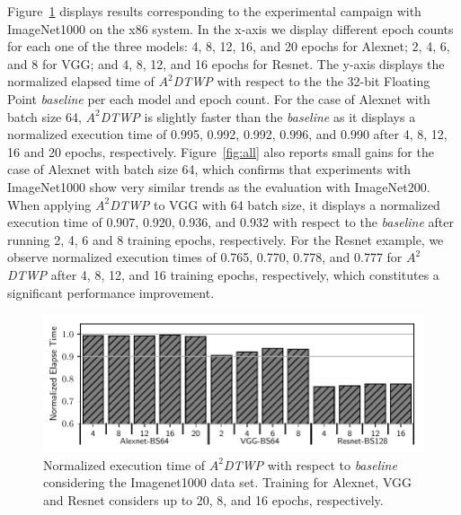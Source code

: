Figure~\ref{fig:ImageNet1000} displays results corresponding to the experimental campaign with ImageNet1000 on the x86 system.
In the x-axis we display different epoch counts for each one of the three models: 4, 8, 12, 16, and 20 epochs for Alexnet; 2, 4, 6, and 8 for VGG; and 4, 8, 12, and 16 epochs for Resnet.
The y-axis displays the normalized elapsed time of \textit{$A^2$DTWP} with respect to the the 32-bit Floating Point \textit{baseline} per each model and epoch count.
For the case of Alexnet with batch size 64, \textit{$A^2$DTWP} is slightly faster than the \textit{baseline} as it displays a normalized execution time of 0.995, 0.992, 0.992, 0.996, and 0.990 after 4, 8, 12, 16 and 20 epochs, respectively.
Figure~\ref{fig:all} also reports small gains for the case of Alexnet with batch size 64, which confirms that experiments with ImageNet1000 show very similar trends as the evaluation with ImageNet200.
When applying \textit{$A^2$DTWP} to VGG with 64 batch size, it displays a normalized execution time of 0.907, 0.920, 0.936, and 0.932 with respect to the \textit{baseline} after running 2, 4, 6 and 8 training epochs, respectively.
For the Resnet example, we observe normalized execution times of 0.765, 0.770, 0.778, and 0.777 for \textit{$A^2$DTWP} after 4, 8, 12, and 16 training epochs, respectively,
which constitutes a significant performance improvement.

\begin{figure}%
    \centerline{\includegraphics[scale=0.65]{figs/imagenet-1k-3net.pdf}}
    \caption{Normalized execution time of \textit{$A^2$DTWP} with respect to \textit{baseline} considering the Imagenet1000 data set. Training for Alexnet, VGG and Resnet considers up to 20, 8, and 16 epochs, respectively.}
    \label{fig:ImageNet1000}
\end{figure}

